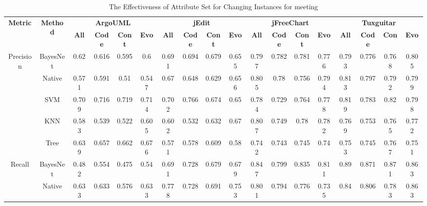 {\begin{table*}[ht]
\scriptsize
\caption{The Effectiveness of Attribute Set for Changing Instances for meeting}
\label{changingsetmeeting}
\centering
\begin{tabular}{|c|c|c|c|c|c|c|c|c|c|c|c|c|c|c|c|c|c|}
\hline
\multirow{2}{*}{\textbf{Metric}}&\multirow{2}{*}{\textbf{Method}}&\multicolumn{4}{|c|}{\textbf{ArgoUML}}&\multicolumn{4}{|c|}{\textbf{jEdit}}&\multicolumn{4}{|c|}{\textbf{jFreeChart}}&\multicolumn{4}{|c|}{\textbf{Tuxguitar}}\\
\cline{3-18}
&&\textbf{All}&\textbf{Code}&\textbf{Cont}&\textbf{Evo}&\textbf{All}&\textbf{Code}&\textbf{Cont}&\textbf{Evo}&\textbf{All}&\textbf{Code}&\textbf{Cont}&\textbf{Evo}&\textbf{All}&\textbf{Code}&\textbf{Con}&\textbf{Evo}~\\
\hline
\multirow{5}{*}{Precision}
&BayesNet&0.62	&0.616&	0.595&	0.6&		0.691&	0.694	&0.679	&0.655	&	0.797	&0.782	&0.781	&0.776		&0.793	&0.776	&0.768&	0.805\\
&Native&0.571	&0.591&	0.51&	0.547	&	0.67&	0.648	&0.629	&0.656	&	0.805	&0.78	&0.756	&0.794	&	0.813	&0.797	&0.792&	0.799\\
&SVM&	0.709	&0.716	&0.719	&0.714		&0.702	&0.766	&0.674	&0.65		&0.784	&0.729	&0.764	&0.778	&	0.819	&0.783	&0.82&	0.798\\
&KNN&	0.583	&0.539	&0.522	&0.605		&0.602	&0.532	&0.632	&0.67		&0.807	&0.749	&0.78	&0.782		&0.769	&0.753	&0.765	&0.772\\
&Tree&	0.639	&0.657	&0.662	&0.676		&0.571	&0.578	&0.609	&0.58		&0.742	&0.743	&0.745&	0.74		&0.753	&0.745	&0.767	&0.751\\
\hline
\multirow{5}{*}{Recall}
&BayesNet&0.482	&0.554	&0.475	&0.54		&0.691	&0.728	&0.679	&0.679		&0.847	&0.799	&0.835	&0.811		&0.89	&0.871	&0.871	&0.863\\
&Native&0.633	&0.633	&0.576	&0.633		&0.778	&0.728	&0.691	&0.753		&0.801	&0.794	&0.776	&0.735		&0.84	&0.806	&0.783	&0.863\\

\end{tabular}
\end{table*}}
